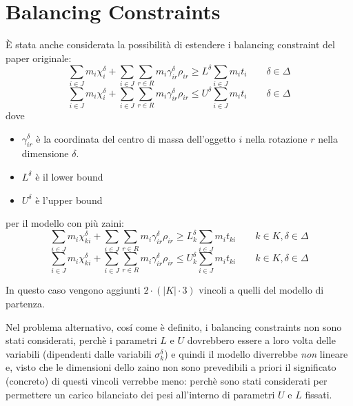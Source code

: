 \section{Balancing Constraints}
\label{sec:Balancing:Constraint}
È stata anche considerata la possibilità di estendere i balancing constraint 
del paper originale:
\setcounter{tmp}{\value{equation}}
\setcounter{equation}{13}
\begin{equation}
\label{eq:orig:balancing1}
\sum_{i \in J} m_i \chi_{i}^\delta + \sum_{i \in J}\sum_{r \in R} m_i \gamma_{ir}^\delta \rho_{ir} \geq L^\delta \sum_{i \in J} m_i t_i \quad\quad \delta \in \Delta
\end{equation}
\begin{equation}
\label{eq:orig:balancing2}
\sum_{i \in J} m_i \chi_{i}^\delta + \sum_{i \in J}\sum_{r \in R} m_i \gamma_{ir}^\delta \rho_{ir} \leq U^\delta \sum_{i \in J} m_i t_i \quad\quad \delta \in \Delta
\end{equation}
\setcounter{equation}{\value{tmp}}
dove 
\begin{itemize}
	\item $\gamma_{ir}^\delta$ è la coordinata del centro di massa dell'oggetto 
	$i$ nella rotazione $r$ nella dimensione $\delta$.
	\item $L^\delta$ è il lower bound 
	\item $U^\delta$ è l'upper bound
\end{itemize}

per il modello con più zaini:
\begin{equation}
\sum_{i \in J} m_i \chi_{ki}^\delta + \sum_{i \in J}\sum_{r \in R} m_i \gamma_{ir}^\delta \rho_{ir} \geq L_k^\delta \sum_{i \in J} m_i t_{ki} \quad\quad k \in K, \delta \in \Delta
\end{equation}
\begin{equation}
\sum_{i \in J} m_i \chi_{ki}^\delta + \sum_{i \in J}\sum_{r \in R} m_i \gamma_{ir}^\delta \rho_{ir} \leq U_k^\delta \sum_{i \in J} m_i t_{ki} \quad\quad k \in K, \delta \in \Delta
\end{equation}

In questo caso vengono aggiunti $2 \cdot (|K| \cdot 3)$ vincoli a quelli del 
modello di partenza.

Nel problema alternativo, cosí come è definito, i balancing constraints non 
sono stati considerati, perchè i parametri $L$ e $U$ dovrebbero essere a loro
volta delle variabili (dipendenti dalle variabili $\sigma_{k}^{\delta}$) e quindi
il modello diverrebbe \emph{non} lineare e, visto che le dimensioni dello zaino
non sono prevedibili a priori il significato (concreto) di questi vincoli verrebbe meno:
perchè sono stati considerati per permettere un carico bilanciato dei pesi all'interno
di parametri $U$ e $L$ fissati.